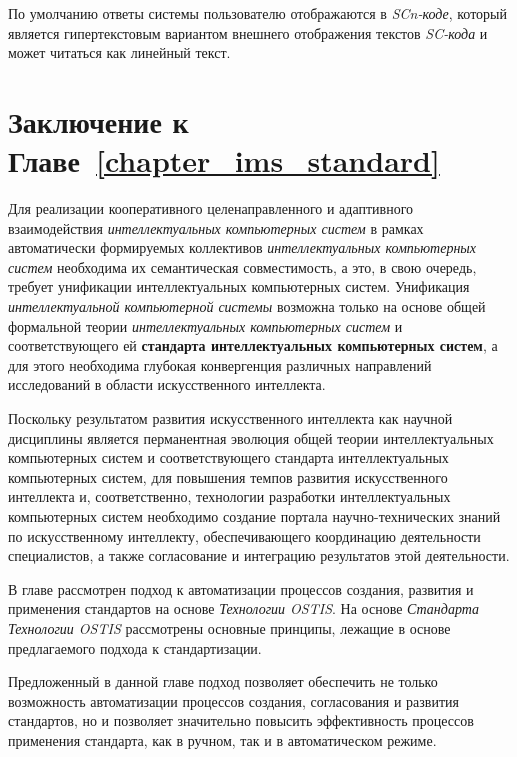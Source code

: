По умолчанию ответы системы пользователю отображаются в \textit{SCn-коде}, который является гипертекстовым вариантом внешнего отображения текстов \textit{SC-кода} и может читаться как линейный текст.

\section*{Заключение к Главе~\ref{chapter_ims_standard}}

Для реализации кооперативного целенаправленного и адаптивного взаимодействия \textit{интеллектуальных компьютерных систем} в рамках автоматически формируемых коллективов \textit{интеллектуальных компьютерных систем} необходима их семантическая совместимость, а это, в свою очередь, требует унификации интеллектуальных компьютерных систем. Унификация \textit{интеллектуальной компьютерной системы} возможна только на основе общей формальной теории \textit{интеллектуальных компьютерных систем} и соответствующего ей \textbf{стандарта интеллектуальных компьютерных систем}, а для этого необходима глубокая конвергенция различных направлений исследований в области искусственного интеллекта.

Поскольку результатом развития искусственного интеллекта как научной дисциплины является перманентная эволюция общей теории интеллектуальных компьютерных систем и соответствующего стандарта интеллектуальных компьютерных систем, для повышения темпов развития искусственного интеллекта и, соответственно, технологии разработки интеллектуальных компьютерных систем необходимо создание портала научно-технических знаний по искусственному интеллекту, обеспечивающего координацию деятельности специалистов, а также согласование и интеграцию результатов этой деятельности.

В главе рассмотрен подход к автоматизации процессов создания, развития и применения стандартов на основе \textit{Технологии OSTIS}. На основе \textit{Стандарта Технологии OSTIS} рассмотрены основные принципы, лежащие в основе предлагаемого подхода к стандартизации.

Предложенный в данной главе подход позволяет обеспечить не только возможность автоматизации процессов создания, согласования и развития стандартов, но и позволяет значительно повысить эффективность процессов применения стандарта, как в ручном, так и в автоматическом режиме.

%
